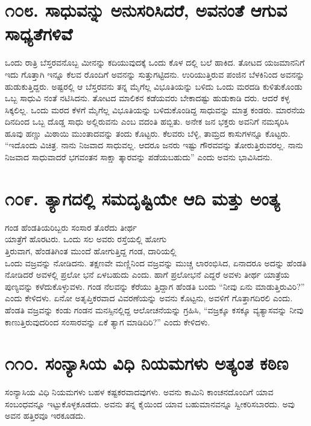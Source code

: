 \section{\num{೧೦೮. } ಸಾಧುವನ್ನು ಅನುಸರಿಸಿದರೆ, ಅವನಂತೆ ಆಗುವ ಸಾಧ್ಯತೆಗಳಿವೆ}

ಒಂದು ರಾತ್ರಿ ಬೆಸ್ತರವನೊಬ್ಬ ಮೀನನ್ನು ಕದಿಯುವುದಕ್ಕೆ ಒಂದು ಕೊಳ ದಲ್ಲಿ ಬಲೆ ಹಾಕಿದ. ತೋಟದ ಯಜಮಾನನಿಗೆ ಇದು ಗೊತ್ತಾಗಿ ಇನ್ನೂ ಕೆಲವ ರೊಂದಿಗೆ ಅವನನ್ನು ಸುತ್ತುಗಟ್ಟಿದನು. ಉರಿಯುತ್ತಿರುವ ಪಂಜಿನ ಬೆಳಕಿನಿಂದ ಅವನನ್ನು ಹುಡುಕುತ್ತಿದ್ದರು. ಅಷ್ಟರಲ್ಲಿ ಆ ಬೆಸ್ತರವನು ತನ್ನ ಮೈಗೆಲ್ಲ ವಿಭೂತಿಯನ್ನು ಬಳಿದು ಒಂದು ಮರದಡಿ ಕುಳಿತುಕೊಂಡು ಒಬ್ಬ ಸಾಧುವಿ ನಂತೆ ನಟಿಸಿದನು. ತೋಟದ ಮಾಲಿಕನ ಕಡೆಯವರು ಬೇಕಾದಷ್ಟು ಹುಡುಕಾಡಿ ದರು. ಆದರೆ ಕಳ್ಳ ಸಿಕ್ಕಲಿಲ್ಲ. ಒಂದು ಮರದ ಕೆಳಗೆ ಮೈಗೆಲ್ಲ ವಿಭೂತಿಯನ್ನು ಬಳಿದುಕೊಂಡಿದ್ದ ಸಾಧುವನ್ನು ಮಾತ್ರ ಕಂಡರು. ಮಾರನೆಯ ದಿನದಿಂದ ಒಬ್ಬ ದೊಡ್ಡ ಸಾಧು ಅಲ್ಲಿರುವನು ಎಂಬ ವದಂತಿ ಹಬ್ಬಿತು. ಅನೇಕ ಜನ ಭಕ್ತರು ಅವನಿಗೆ ನಮಸ್ಕರಿಸಿ ಹೂವು ಹಣ್ಣು ಮಿಠಾಯಿ ಮುಂತಾದವನ್ನು ತಂದು ಕೊಟ್ಟರು. ಕೆಲವರು ಬೆಳ್ಳಿ, ತಾಮ್ರದ ಕಾಸುಗಳನ್ನೂ ಕೊಟ್ಟರು. “ಇದೊಂದು ವಿಚಿತ್ರ. ನಾನು ನಿಜವಾದ ಸಾಧುವಲ್ಲ. ಆದರೂ ಜನರು ಇಷ್ಟು ಗೌರವವನ್ನು ತೋರುತ್ತಿರುವರಲ್ಲ. ನಾನು ನಿಜವಾದ ಸಾಧುವಾದರೆ ಭಗವಂತನ ಸಾಕ್ಷಾ ತ್ಕಾರವನ್ನು ಪಡೆಯಬಹುದು” ಎಂದು ಅವನು ಭಾವಿಸಿದನು.


\section{\num{೧೦೯. } ತ್ಯಾಗದಲ್ಲಿ ಸಮದೃಷ್ಟಿಯೇ ಆದಿ ಮತ್ತು ಅಂತ್ಯ}

ಗಂಡ ಹೆಂಡತಿಯರಿಬ್ಬರು ಸಂಸಾರ ತೊರೆದು ತೀರ್ಥ\\ಯಾತ್ರೆಗೆ ಹೊರಟರು. ಒಂದು ಸಲ ಅವರು ರಸ್ತೆಯಲ್ಲಿ ಹೋಗು\\ತ್ತಿರುವಾಗ, ಹೆಂಡತಿಗಿಂತ ಮುಂದೆ ಹೋಗುತ್ತಿದ್ದ ಗಂಡ, ದಾರಿಯಲ್ಲಿ\\ಒಂದು ವಜ್ರವನ್ನು ನೋಡಿದನು. ತಕ್ಷಣವೇ ಮಣ್ಣಿನಿಂದ ವಜ್ರವನ್ನು ಮುಚ್ಚ ಲಾರಂಭಿಸಿದ, ಏನಾದರೂ ಅದನ್ನು ಹೆಂಡತಿ ನೋಡಿದರೆ ಅವಳಲ್ಲಿ ಪ್ರಲೋ ಭನೆ ಏಳಬಹುದು ಎಂದು. ಹಾಗೆ ಪ್ರಲೋಭನೆ ಎದ್ದರೆ ಅವಳು ತೀರ್ಥ ಯಾತ್ರೆಯ ಪುಣ್ಯವನ್ನು ಕಳೆದುಕೊಳ್ಳುವಳು. ಗಂಡ ನೆಲವನ್ನು ಕೆರೆಯು ತ್ತಿದ್ದಾಗ ಹೆಂಡತಿ ಬಂದು “ನೀವು ಏನು ಮಾಡುತ್ತಿರುವಿರಿ?” ಎಂದು ಕೇಳಿದಳು. ಏನೋ ಅತೃಪ್ತಿಕರವಾದ ವಿವರಣೆಯನ್ನು ಅವನು ಕೊಟ್ಟನು, ಅವಳಿಗೆ ಗೊತ್ತಾಗದಿರಲಿ ಎಂದು. ಹೆಂಡತಿ ವಜ್ರವನ್ನು ಕಂಡು ಗಂಡನ ಮನಸ್ಸಿನಲ್ಲಿದ್ದ ಆಲೋಚನೆಯನ್ನು ಗ್ರಹಿಸಿ, “ವಜ್ರಕ್ಕೂ ಕಸಕ್ಕೂ ವ್ಯತ್ಯಾಸವನ್ನು ನೀವು ಕಾಣುತ್ತಿರುವುದರಿಂದ ಸಂಸಾರವನ್ನು ಏಕೆ ತ್ಯಾಗ ಮಾಡಿದಿರಿ?” ಎಂದು ಕೇಳಿದಳು.


\section{\num{೧೧೦. } ಸಂನ್ಯಾಸಿಯ ವಿಧಿ ನಿಯಮಗಳು ಅತ್ಯಂತ ಕಠಿಣ}

ಸಂನ್ಯಾಸಿಯ ವಿಧಿ ನಿಯಮಗಳು ಬಹಳ ಕಷ್ಟಕರವಾದವುಗಳು. ಅವನು ಕಾಮಿನಿ ಕಾಂಚನದೊಂದಿಗೆ ಯಾವ ಸಂಬಂಧವನ್ನೂ ಇಟ್ಟುಕೊಳ್ಳಕೂಡದು. ಅವನು ತನ್ನ ಕೈಯಿಂದ ಯಾವ ಬಹುಮಾನವನ್ನೂ ಸ್ವೀಕರಿಸಬಾರದು. ಅವು ಅವನ ಹತ್ತಿರವೂ ಇರಕೂಡದು.

